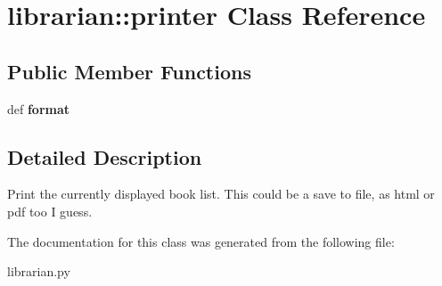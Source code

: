 \hypertarget{classlibrarian_1_1printer}{
\section{librarian::printer Class Reference}
\label{classlibrarian_1_1printer}
}
\subsection*{Public Member Functions}
\begin{DoxyCompactItemize}
\item 
\hypertarget{classlibrarian_1_1printer_a92870b39a5aab78bfba996fa5b7019f4}{
def {\bfseries format}}
\label{classlibrarian_1_1printer_a92870b39a5aab78bfba996fa5b7019f4}

\end{DoxyCompactItemize}


\subsection{Detailed Description}
\begin{DoxyVerb}Print the currently displayed book list.
This could be a save to file, as html or pdf too I guess.
\end{DoxyVerb}
 

The documentation for this class was generated from the following file:\begin{DoxyCompactItemize}
\item 
librarian.py\end{DoxyCompactItemize}
